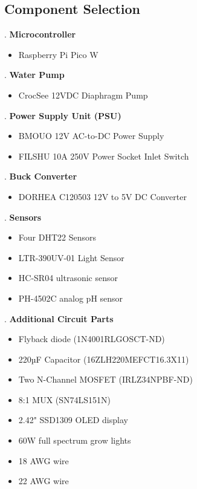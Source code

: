 \documentclass[12pt]{article} %
\begin{document}
\subsection{Component Selection}
. \textbf{Microcontroller}
\begin{itemize}
    \item Raspberry Pi Pico W
\end{itemize}

. \textbf{Water Pump}
\begin{itemize}
    \item CrocSee 12VDC Diaphragm Pump
\end{itemize}

. \textbf{Power Supply Unit (PSU)} 
\begin{itemize}
    \item BMOUO 12V AC-to-DC Power Supply 
    \item FILSHU 10A 250V Power Socket Inlet Switch
\end{itemize}

. \textbf{Buck Converter}
\begin{itemize}
    \item DORHEA C120503 12V to 5V DC Converter
\end{itemize}

. \textbf{Sensors}
   \begin{itemize}
   \item Four DHT22 Sensors
   \item LTR-390UV-01 Light Sensor
   \item HC-SR04 ultrasonic sensor
   \item PH-4502C analog pH sensor
   \end{itemize}

. \textbf{Additional Circuit Parts}
   \begin{itemize}
   \item Flyback diode (1N4001RLGOSCT-ND)
   \item 220µF Capacitor (16ZLH220MEFCT16.3X11)
   \item Two N-Channel MOSFET (IRLZ34NPBF-ND)
   \item 8:1 MUX (SN74LS151N)
   \item 2.42" SSD1309 OLED display
   \item 60W full spectrum grow lights
   \item 18 AWG wire
   \item 22 AWG wire
   \end{itemize}
\end{document}
